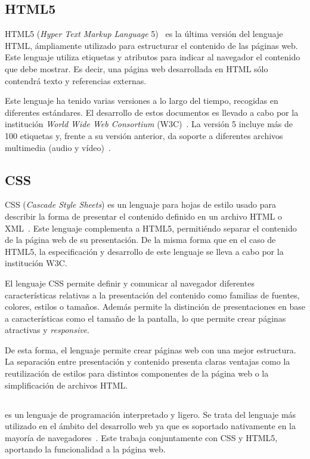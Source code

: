 \subsection{HTML5}
HTML5 (\textit{Hyper Text Markup Language} 5)~\cite{html5-standard} es la última versión del lenguaje HTML, ámpliamente utilizado para estructurar el contenido de las páginas web. Este lenguaje utiliza etiquetas y atributos para indicar al navegador el contenido que debe mostrar. Es decir, una página web desarrollada en HTML sólo contendrá texto y referencias externas. 

Este lenguaje ha tenido varias versiones a lo largo del tiempo, recogidas en diferentes estándares. El desarrollo de estos documentos es llevado a cabo por la institución \textit{World Wide Web Consortium} (W3C)~\cite{www-consortium}\@. La versión 5 incluye más de 100 etiquetas y, frente a su versión anterior, da soporte a diferentes archivos multimedia (audio y vídeo)~\cite{htm4vshtml5}\@.

\subsection{CSS}

CSS (\textit{Cascade Style Sheets}) es un lenguaje para hojas de estilo usado para describir la forma de presentar el contenido definido en un archivo HTML o XML~\cite{css}\@. Este lenguaje complementa a HTML5, permitiéndo separar el contenido de la página web de su presentación. De la misma forma que en el caso de HTML5, la especificación y desarrollo de este lenguaje se lleva a cabo por la institución W3C.

El lenguaje CSS permite definir y comunicar al navegador diferentes características relativas a la presentación del contenido como familias de fuentes, colores, estilos o tamaños. Además permite la distinción de presentaciones en base a características como el tamaño de la pantalla, lo que permite crear páginas atractivas y \textit{responsive}. 

De esta forma, el lenguaje permite crear páginas web con una mejor estructura. La separación entre presentación y contenido presenta claras ventajas como la reutilización de estilos para distintos componentes de la página web o la simplificación de archivos HTML\@.

\subsection{\js}
{\js} es un lenguaje de programación interpretado y ligero. Se trata del lenguaje más utilizado en el ámbito del desarrollo web ya que es soportado nativamente en la mayoría de navegadores~\cite{javascript}\@. Este trabaja conjuntamente con CSS y HTML5, aportando la funcionalidad a la página web.

